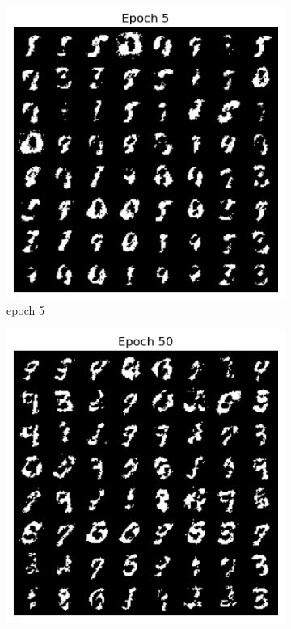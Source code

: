 \documentclass[a4paper]{article}
\theoremstyle{definition}
\newenvironment{soln}{
	\leavevmode\color{blue}\ignorespaces
}{}
\begin{document}
\begin{enumerate} [label=(\alph*)]
\begin{soln}
			\begin{figure}[H]
				\centering
				\begin{subfigure}[b]{0.3\textwidth}
					\centering
					\includegraphics[width=\textwidth]{3-Epoch5.png}
					\caption{epoch 5}
				\end{subfigure}
				\hfill
				\begin{subfigure}[b]{0.3\textwidth}
					\centering
					\includegraphics[width=\textwidth]{3-Epoch50.png}

\end{subfigure}
\end{figure}
\end{soln}
\end{enumerate}
\end{document}
